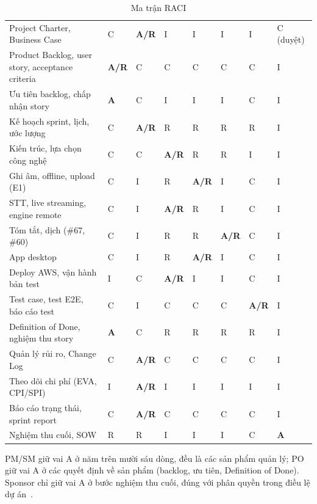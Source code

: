 \documentclass[12pt,a4paper]{report}
\begin{document}
\begin{table}[htbp]
  \centering
  \caption{Ma trận RACI}
  \label{tab:raci}
  \small
  \setlength{\tabcolsep}{3pt}
  \begin{tabularx}{\linewidth}{@{}LQ{0.95cm}Q{1.35cm}Q{1.3cm}Q{1.3cm}Q{1.3cm}Q{0.95cm}Q{1.55cm}@{}}
    \toprule
     &  &  &  &  & 
      &  &  \\
    \midrule
    Project Charter, Business Case & C & \textbf{A/R} & I & I & I & I & C (duyệt) \\
    Product Backlog, user story, acceptance criteria & \textbf{A/R} & C & C & C & C & C & I \\
    Ưu tiên backlog, chấp nhận story & \textbf{A} & C & I & I & I & C & I \\
    Kế hoạch sprint, lịch, ước lượng & C & \textbf{A/R} & R & R & R & R & I \\
    Kiến trúc, lựa chọn công nghệ & C & C & \textbf{A/R} & R & R & I & I \\
    Ghi âm, offline, upload (E1) & C & I & R & \textbf{A/R} & I & C & I \\
    STT, live streaming, engine remote & C & I & \textbf{A/R} & R & I & C & I \\
    Tóm tắt, dịch (\#67, \#60) & C & I & R & R & \textbf{A/R} & C & I \\
    App desktop & C & I & R & \textbf{A/R} & I & C & I \\
    Deploy AWS, vận hành bản test & I & C & \textbf{A/R} & I & I & C & I \\
    Test case, test E2E, báo cáo test & C & I & C & C & C & \textbf{A/R} & I \\
    Definition of Done, nghiệm thu story & \textbf{A} & C & R & R & R & R & I \\
    Quản lý rủi ro, Change Log & C & \textbf{A/R} & C & C & C & C & I \\
    Theo dõi chi phí (EVA, CPI/SPI) & I & \textbf{A/R} & I & I & I & I & I \\
    Báo cáo trạng thái, sprint report & C & \textbf{A/R} & C & C & C & C & I \\
    Nghiệm thu cuối, SOW & R & R & I & I & I & C & \textbf{A} \\
    \bottomrule
  \end{tabularx}
\end{table}

PM/SM giữ vai A ở năm trên mười sáu dòng, đều là các sản phẩm quản lý; PO giữ vai A ở các quyết định về sản phẩm
(backlog, ưu tiên, Definition of Done). Sponsor chỉ giữ vai A ở bước nghiệm thu cuối, đúng với phân quyền trong
điều lệ dự án~\cite{pid}.
\end{document}
